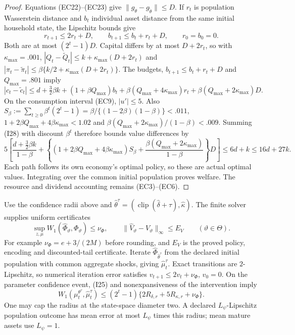\documentclass[11pt,a4paper]{article}
\begin{document}
\begin{proof}
Equations \textup{(EC22)--(EC23)} give $\|g_\theta-g_{\widetilde\theta}\|\leq D$.
If $r_t$ is population Wasserstein distance and $b_t$ individual asset
distance from the same initial household state, the Lipschitz bounds give
\[
 r_{t+1}\leq2r_t+D,\qquad b_{t+1}\leq b_t+r_t+D,\qquad
 r_0=b_0=0.                                                 \tag{I27}
\]
Both are at most $(2^t-1)D$. Capital differs by at most $D+2r_t$, so
with $\kappa_{\max}=.001$,
$|Q_t-\widetilde Q_t|\leq k+\kappa_{\max}(D+2r_t)$ and
$|\pi_t-\widetilde\pi_t|\leq\beta\{k/2+\kappa_{\max}(D+2r_t)\}$.
The budgets, $b_{t+1}\leq b_t+r_t+D$ and $Q_{\max}=.801$ imply
\[
 |c_t-\widetilde c_t|\leq d+\tfrac32\beta k
 +(1+\beta Q_{\max})b_t+\beta(Q_{\max}+4\kappa_{\max})r_t
                         +\beta(Q_{\max}+2\kappa_{\max})D. \tag{I28}
\]
On the consumption interval \textup{(EC9)}, $|u'|\leq5$. Also
$S_\beta:=\sum_{t\geq0}\beta^t(2^t-1)
=\beta/\{(1-2\beta)(1-\beta)\}<.011$,
$1+2\beta Q_{\max}+4\beta\kappa_{\max}<1.02$ and
$\beta(Q_{\max}+2\kappa_{\max})/(1-\beta)<.009$.
Summing \textup{(I28)} with discount $\beta^t$ therefore bounds value differences by
\[
 5\left[\frac{d+\tfrac32\beta k}{1-\beta}
 +\left\{(1+2\beta Q_{\max}+4\beta\kappa_{\max})S_\beta
       +\frac{\beta(Q_{\max}+2\kappa_{\max})}{1-\beta}\right\}D\right]
 \leq6d+k\leq16d+27k.                                      \tag{I29}
\]
Each path follows its own economy's optimal policy, so these are actual
optimal values. Integrating over the common initial population proves welfare.
The resource and dividend accounting remains \textup{(EC3)--(EC6)}.
\end{proof}

Use the confidence radii above and
$\widehat\theta^\tau=(\operatorname{clip}(\widehat\delta+\tau),\widehat\kappa)$.
The finite solver supplies uniform certificates
\[
 \sup_{z,\mu}W_1(\widehat\Phi_\vartheta,\Phi_\vartheta)\leq\nu_\Phi,
 \qquad\|\widehat V_\vartheta-V_\vartheta\|_\infty\leq E_V
 \qquad(\vartheta\in\Theta).                                \tag{I30}
\]
For example $\nu_\Phi=e+3/(2M)$ before rounding, and $E_V$ is the proved
policy, encoding and discounted-tail certificate. Iterate
$\widehat\Phi_{\widehat\theta^\tau}$ from the declared initial population
with common aggregate shocks, giving $\widehat\mu_t^\tau$. Exact transitions
are $2$-Lipschitz, so numerical iteration error satisfies
$v_{t+1}\leq2v_t+\nu_\Phi$, $v_0=0$. On the parameter confidence event,
\textup{(I25)} and nonexpansiveness of the intervention imply
\[
 W_1(\mu_t^{\theta^\tau},\widehat\mu_t^\tau)
 \leq(2^t-1)\{2R_{\delta,r}+5R_{\kappa,r}+\nu_\Phi\}.       \tag{I31}
\]
One may cap the radius at the state-space diameter two. A declared
$L_\psi$-Lipschitz population outcome has mean error at most $L_\psi$ times
this radius; mean mature assets use $L_\psi=1$.
\end{document}

